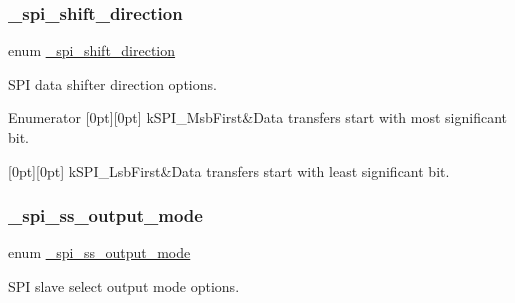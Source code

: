 \subsubsection{\texorpdfstring{\_spi\_shift\_direction}{\_spi\_shift\_direction}}
{\footnotesize\ttfamily enum \mbox{\hyperlink{group__spi__driver_ga1737fd82344e0800f66b541342894b85}{\+\_\+spi\+\_\+shift\+\_\+direction}}}



S\+PI data shifter direction options. 

\begin{DoxyEnumFields}{Enumerator}
[0pt][0pt]{}\mbox{\label{group__spi__driver_gga1737fd82344e0800f66b541342894b85ae7b997e8cff761aab865cbd42c4c3989}} 
k\+S\+P\+I\+\_\+\+Msb\+First&Data transfers start with most significant bit. \\
\hline

[0pt][0pt]{}\mbox{\label{group__spi__driver_gga1737fd82344e0800f66b541342894b85a20ac53684c3e1ad338553cecbfab94a9}} 
k\+S\+P\+I\+\_\+\+Lsb\+First&Data transfers start with least significant bit. \\
\hline

\end{DoxyEnumFields}
\mbox{\label{group__spi__driver_ga2e815689312c22a94fe0519f7bc0a991}} 
\subsubsection{\texorpdfstring{\_spi\_ss\_output\_mode}{\_spi\_ss\_output\_mode}}
{\footnotesize\ttfamily enum \mbox{\hyperlink{group__spi__driver_ga2e815689312c22a94fe0519f7bc0a991}{\+\_\+spi\+\_\+ss\+\_\+output\+\_\+mode}}}



S\+PI slave select output mode options. 

